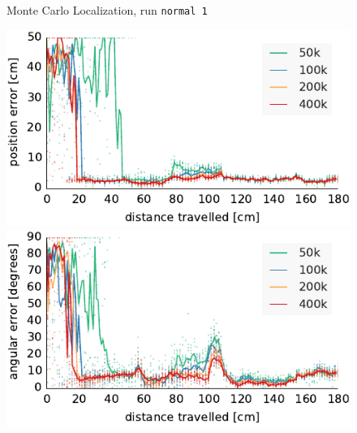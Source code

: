 \documentclass[letterpaper, 10pt, conference]{ieeeconf}
\begin{document}
\begin{figure}
\begin{center}
Monte Carlo Localization, run \texttt{normal 1}
\end{center}
\includegraphics{mcl-whole_random_1-xy}\hfill
\includegraphics{mcl-whole_random_1-theta}

\vspace{.5em}


\end{figure}
\end{document}
